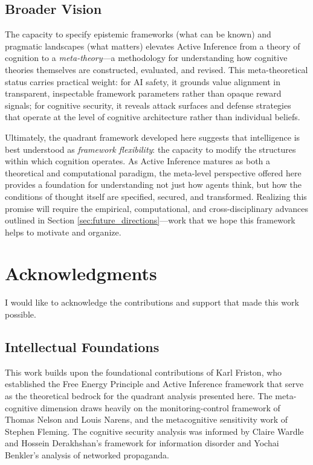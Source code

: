 \documentclass[
]{article}
\begin{document}
\subsection{Broader Vision}\label{broader-vision}

The capacity to specify epistemic frameworks (what can be known) and
pragmatic landscapes (what matters) elevates Active Inference from a
theory of cognition to a \emph{meta-theory}---a methodology for
understanding how cognitive theories themselves are constructed,
evaluated, and revised. This meta-theoretical status carries practical
weight: for AI safety, it grounds value alignment in transparent,
inspectable framework parameters rather than opaque reward signals; for
cognitive security, it reveals attack surfaces and defense strategies
that operate at the level of cognitive architecture rather than
individual beliefs.

Ultimately, the quadrant framework developed here suggests that
intelligence is best understood as \emph{framework flexibility}: the
capacity to modify the structures within which cognition operates. As
Active Inference matures as both a theoretical and computational
paradigm, the meta-level perspective offered here provides a foundation
for understanding not just how agents think, but how the conditions of
thought itself are specified, secured, and transformed. Realizing this
promise will require the empirical, computational, and
cross-disciplinary advances outlined in Section
\ref{sec:future_directions}---work that we hope this framework helps to
motivate and organize.

\newpage

\section{Acknowledgments}\label{sec:acknowledgments}

I would like to acknowledge the contributions and support that made this
work possible.

\subsection{Intellectual Foundations}\label{intellectual-foundations}

This work builds upon the foundational contributions of Karl Friston,
who established the Free Energy Principle and Active Inference framework
that serve as the theoretical bedrock for the quadrant analysis
presented here. The meta-cognitive dimension draws heavily on the
monitoring-control framework of Thomas Nelson and Louis Narens, and the
metacognitive sensitivity work of Stephen Fleming. The cognitive
security analysis was informed by Claire Wardle and Hossein Derakhshan's
framework for information disorder and Yochai Benkler's analysis of
networked propaganda.
\end{document}
